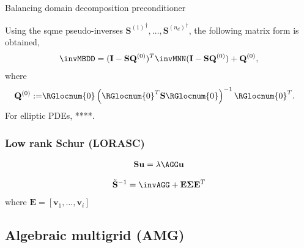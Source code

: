 \documentclass{article}
\begin{document}
\begin{algorithm}[ht]
	\caption{Balancing domain decomposition preconditioner}
	\label{alg:BDD}
	\begin{algorithmic}[1]
		\ENDFOR
	\end{algorithmic}
\end{algorithm}
Using the sqme pseudo-inverses ${\mathbf{S}^{(1)}}^\dagger,\dots,{\mathbf{S}^{(n_d)}}^\dagger$, the following matrix form is obtained,
\begin{align}
\invMBDD=
(\mathbf{I}-\mathbf{S}\mathbf{Q}^{(0)})^T
\invMNN
(\mathbf{I}-\mathbf{S}\mathbf{Q}^{(0)})
+
{\mathbf{Q}^{(0)}},
\end{align}
where
\begin{align}
\mathbf{Q}^{(0)}:=&\RGlocnum{0}\left(\RGlocnum{0}^T\mathbf{S}\RGlocnum{0}\right)^{-1}\RGlocnum{0}^T.%
\end{align}
For elliptic PDEs, ****.


\subsubsection{Low rank Schur (LORASC)}

\begin{align}
\mathbf{S}\mathbf{u}=\lambda\AGG\mathbf{u}
\end{align}

\begin{align}
\tilde{\mathbf{S}}^{-1}=\invAGG+\mathbf{E}\boldsymbol{\Sigma}\mathbf{E}^T
\end{align}
where $\mathbf{E}=[\mathbf{v}_1,\dots,\mathbf{v}_i]$

\subsection{Algebraic multigrid (AMG)}
\end{document}
